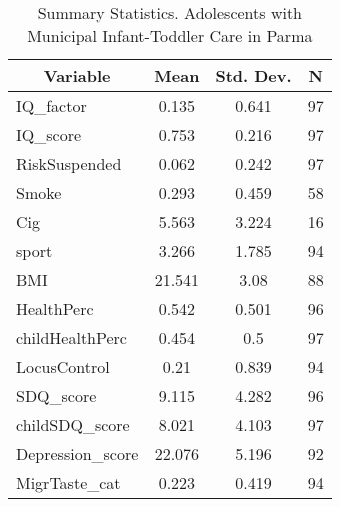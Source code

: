 
\begin{table}[htbp]\centering \caption{Summary Statistics. Adolescents with Municipal Infant-Toddler Care in Parma \label{bothAdolasiloMuniParma}}
\begin{tabular}{l c c  c}\hline\hline
\multicolumn{1}{c}{\textbf{Variable}} & \textbf{Mean}
 & \textbf{Std. Dev.} & \textbf{N}\\ \hline
IQ\_factor & 0.135 & 0.641  & 97\\
IQ\_score & 0.753 & 0.216  & 97\\
RiskSuspended & 0.062 & 0.242  & 97\\
Smoke & 0.293 & 0.459  & 58\\
Cig & 5.563 & 3.224  & 16\\
sport & 3.266 & 1.785  & 94\\
BMI & 21.541 & 3.08  & 88\\
HealthPerc & 0.542 & 0.501  & 96\\
childHealthPerc & 0.454 & 0.5  & 97\\
LocusControl & 0.21 & 0.839  & 94\\
SDQ\_score & 9.115 & 4.282  & 96\\
childSDQ\_score & 8.021 & 4.103  & 97\\
Depression\_score & 22.076 & 5.196  & 92\\
MigrTaste\_cat & 0.223 & 0.419  & 94\\
\hline\end{tabular}
\end{table}
